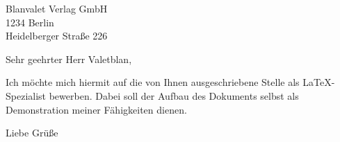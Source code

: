 \documentclass{scrlttr2}
\begin{document}
\begin{letter}{Blanvalet Verlag GmbH\\1234 Berlin\\Heidelberger Straße 226}
	\opening{Sehr geehrter Herr Valetblan,}
	Ich möchte mich hiermit auf die von Ihnen ausgeschriebene Stelle als \LaTeX-Spezialist bewerben. Dabei soll der Aufbau des Dokuments selbst als Demonstration meiner Fähigkeiten dienen.\\
	\closing{Liebe Grüße}
\end{letter}
\end{document}

